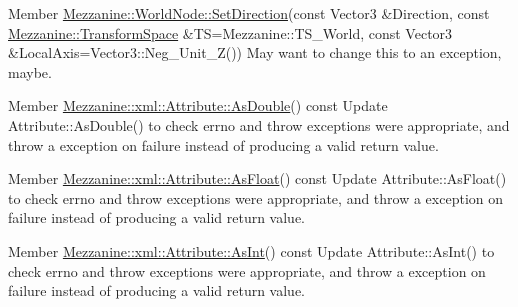 \label{todo__todo000048}
\hypertarget{todo__todo000048}{}
 
\begin{DoxyDescription}
\item[Member \hyperlink{classMezzanine_1_1WorldNode_ab088981b0bea9d73e9bfaac5f237abc8}{Mezzanine::WorldNode::SetDirection}(const Vector3 \&Direction, const \hyperlink{namespaceMezzanine_ad81c74de3529f1e643bd145173924ed3}{Mezzanine::TransformSpace} \&TS=Mezzanine::TS\_\-World, const Vector3 \&LocalAxis=Vector3::Neg\_\-Unit\_\-Z()) ]May want to change this to an exception, maybe. 
\end{DoxyDescription}

\label{todo__todo000060}
\hypertarget{todo__todo000060}{}
 
\begin{DoxyDescription}
\item[Member \hyperlink{classMezzanine_1_1xml_1_1Attribute_af7c9a4dd3907c53875b60fffd0737731}{Mezzanine::xml::Attribute::AsDouble}() const  ]Update Attribute::AsDouble() to check errno and throw exceptions were appropriate, and throw a exception on failure instead of producing a valid return value. 
\end{DoxyDescription}

\label{todo__todo000061}
\hypertarget{todo__todo000061}{}
 
\begin{DoxyDescription}
\item[Member \hyperlink{classMezzanine_1_1xml_1_1Attribute_a0b941b115c4ee1a2e9bcffd044a32a86}{Mezzanine::xml::Attribute::AsFloat}() const  ]Update Attribute::AsFloat() to check errno and throw exceptions were appropriate, and throw a exception on failure instead of producing a valid return value. 
\end{DoxyDescription}

\label{todo__todo000058}
\hypertarget{todo__todo000058}{}
 
\begin{DoxyDescription}
\item[Member \hyperlink{classMezzanine_1_1xml_1_1Attribute_afe13b2cfd2ae5425efdfbb7e537c5b02}{Mezzanine::xml::Attribute::AsInt}() const  ]Update Attribute::AsInt() to check errno and throw exceptions were appropriate, and throw a exception on failure instead of producing a valid return value. 
\end{DoxyDescription}

\label{todo__todo000059}
\hypertarget{todo__todo000059}{}
 
